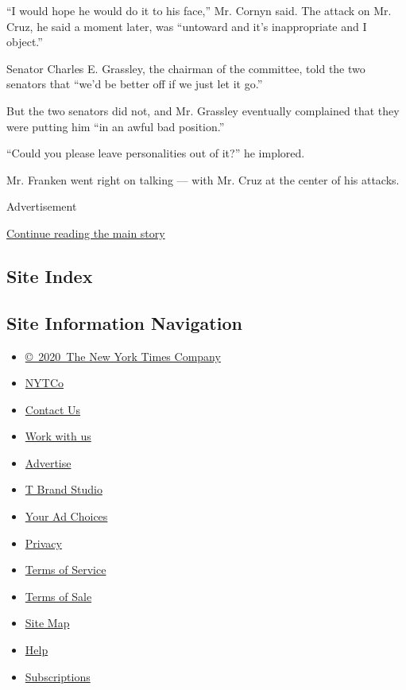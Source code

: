 ``I would hope he would do it to his face,'' Mr. Cornyn said. The attack
on Mr. Cruz, he said a moment later, was ``untoward and it's
inappropriate and I object.''

Senator Charles E. Grassley, the chairman of the committee, told the two
senators that ``we'd be better off if we just let it go.''

But the two senators did not, and Mr. Grassley eventually complained
that they were putting him ``in an awful bad position.''

``Could you please leave personalities out of it?'' he implored.

Mr. Franken went right on talking --- with Mr. Cruz at the center of his
attacks.

Advertisement

\protect\hyperlink{after-bottom}{Continue reading the main story}

\hypertarget{site-index}{%
\subsection{Site Index}\label{site-index}}

\hypertarget{site-information-navigation}{%
\subsection{Site Information
Navigation}\label{site-information-navigation}}

\begin{itemize}
\tightlist
\item
  \href{https://help.nytimes.com/hc/en-us/articles/115014792127-Copyright-notice}{©~2020~The
  New York Times Company}
\end{itemize}

\begin{itemize}
\tightlist
\item
  \href{https://www.nytco.com/}{NYTCo}
\item
  \href{https://help.nytimes.com/hc/en-us/articles/115015385887-Contact-Us}{Contact
  Us}
\item
  \href{https://www.nytco.com/careers/}{Work with us}
\item
  \href{https://nytmediakit.com/}{Advertise}
\item
  \href{http://www.tbrandstudio.com/}{T Brand Studio}
\item
  \href{https://www.nytimes.com/privacy/cookie-policy\#how-do-i-manage-trackers}{Your
  Ad Choices}
\item
  \href{https://www.nytimes.com/privacy}{Privacy}
\item
  \href{https://help.nytimes.com/hc/en-us/articles/115014893428-Terms-of-service}{Terms
  of Service}
\item
  \href{https://help.nytimes.com/hc/en-us/articles/115014893968-Terms-of-sale}{Terms
  of Sale}
\item
  \href{https://spiderbites.nytimes.com}{Site Map}
\item
  \href{https://help.nytimes.com/hc/en-us}{Help}
\item
  \href{https://www.nytimes.com/subscription?campaignId=37WXW}{Subscriptions}
\end{itemize}
